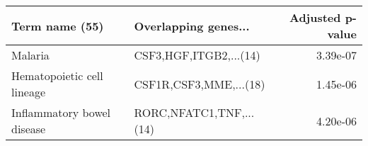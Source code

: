 \begin{tabular}{llr}
\toprule
            Term name (55) &    Overlapping genes... &  Adjusted p-value \\
\midrule
                   Malaria &  CSF3,HGF,ITGB2,...(14) &          3.39e-07 \\
Hematopoietic cell lineage &  CSF1R,CSF3,MME,...(18) &          1.45e-06 \\
Inflammatory bowel disease & RORC,NFATC1,TNF,...(14) &          4.20e-06 \\
\bottomrule
\end{tabular}
